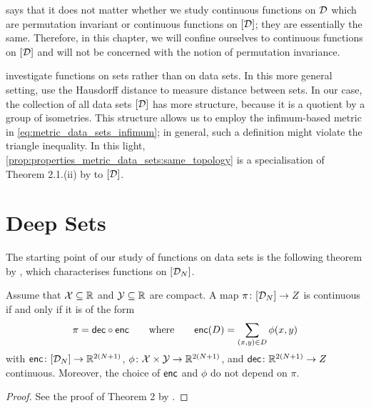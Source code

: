\documentclass[12pt, twoside]{report}
\begin{document}
 says that it does not matter whether we study continuous functions on $\D$ which are permutation invariant or continuous functions on $[\D]$;
they are essentially the same.
Therefore, in this chapter, we will confine ourselves to continuous functions on $[\D]$ and will not be concerned with the notion of permutation invariance.

\Textcite{Qi:2017:PointNet_Deep_Learning_on_Point} investigate functions on sets rather than on data sets.
In this more general setting, \citeauthor{Qi:2017:PointNet_Deep_Learning_on_Point} use the Hausdorff distance to measure distance between sets.
In our case, the collection of all data sets $[\D]$ has more structure, because it is a quotient by a group of isometries.
This structure allows us to employ the infimum-based metric in \eqref{eq:metric_data_sets_infimum};
in general, such a definition might violate the triangle inequality.
In this light, \cref{prop:properties_metric_data_sets:same_topology} is a specialisation of Theorem 2.1.(ii) by \textcite{Cagliari:2015:The_Natural_Pseudo-Distance_as_A} to $[\D]$.

\section{Deep Sets}
\label{sec:repr_theorems:deep_sets}

The starting point of our study of functions on data sets is the following theorem by \textcite{Zaheer:2017:Deep_Sets}, which characterises functions on $[\D_N]$.

\begin{theorem} \label{thm:deep_set_preliminary}
    Assume that $\X \sub \R$ and $\Y \sub \R$ are compact.
    A map $\pi \colon [\D_N] \to Z$ is continuous if and only if it is of the form
    \begin{equation} \label{eq:deep_set_preliminary}
        \pi = \dec \comp \enc \qquad \text{where} \qquad
        \enc(D) = \sum_{\smash{(x, y) \in D}} \phi(x, y)
    \end{equation}
    with $\enc \colon [\D_N] \to \smash{\R^{2(N+1)}}$,
    $\phi\colon \X \times \Y \to \smash{\R^{2(N+1)}}$, and
    $\dec \colon \smash{\R^{2(N+1)}} \to Z$ continuous.
    Moreover, the choice of $\enc$ and $\phi$ do not depend on $\pi$.
\end{theorem}
\begin{proof}
    See the proof of Theorem 2 by \textcite{Zaheer:2017:Deep_Sets}.
\end{proof}
\end{document}
